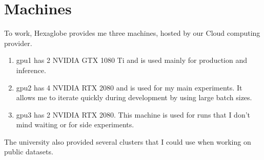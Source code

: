 \section{Machines}

To work, Hexaglobe provides me three machines, hosted by our Cloud computing provider.

\begin{enumerate}
    \item gpu1 has 2 NVIDIA GTX 1080 Ti and is used mainly for production and inference.
    \item gpu2 has 4 NVIDIA RTX 2080 and is used for my main experiments. It allows me to iterate quickly during development by using large batch sizes.
    \item gpu3 has 2 NVIDIA RTX 2080. This machine is used for runs that I don't mind waiting or for side experiments.
\end{enumerate}

The university also provided several clusters that I could use when working on public datasets.